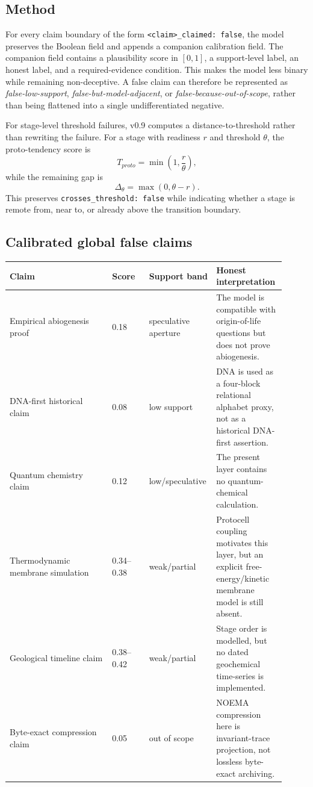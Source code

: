 \documentclass[11pt]{article}
\begin{document}
\subsection{Method}
For every claim boundary of the form \texttt{<claim>\_claimed: false}, the model preserves the Boolean field and appends a companion calibration field.  The companion field contains a plausibility score in $[0,1]$, a support-level label, an honest label, and a required-evidence condition.  This makes the model less binary while remaining non-deceptive.  A false claim can therefore be represented as \emph{false-low-support}, \emph{false-but-model-adjacent}, or \emph{false-because-out-of-scope}, rather than being flattened into a single undifferentiated negative.

For stage-level threshold failures, v0.9 computes a distance-to-threshold rather than rewriting the failure.  For a stage with readiness $r$ and threshold $\theta$, the proto-tendency score is
\[
  T_{proto} = \min\left(1, \frac{r}{\theta}\right),
\]
while the remaining gap is
\[
  \Delta_\theta = \max(0, \theta-r).
\]
This preserves \texttt{crosses\_threshold: false} while indicating whether a stage is remote from, near to, or already above the transition boundary.

\subsection{Calibrated global false claims}
\begin{longtable}{p{0.36\linewidth}p{0.13\linewidth}p{0.18\linewidth}p{0.24\linewidth}}
\toprule
Claim & Score & Support band & Honest interpretation \\
\midrule
Empirical abiogenesis proof & 0.18 & speculative aperture & The model is compatible with origin-of-life questions but does not prove abiogenesis. \\
DNA-first historical claim & 0.08 & low support & DNA is used as a four-block relational alphabet proxy, not as a historical DNA-first assertion. \\
Quantum chemistry claim & 0.12 & low/speculative & The present layer contains no quantum-chemical calculation. \\
Thermodynamic membrane simulation & 0.34--0.38 & weak/partial & Protocell coupling motivates this layer, but an explicit free-energy/kinetic membrane model is still absent. \\
Geological timeline claim & 0.38--0.42 & weak/partial & Stage order is modelled, but no dated geochemical time-series is implemented. \\
Byte-exact compression claim & 0.05 & out of scope & NOEMA compression here is invariant-trace projection, not lossless byte-exact archiving. \\
\bottomrule
\end{longtable}
\end{document}
